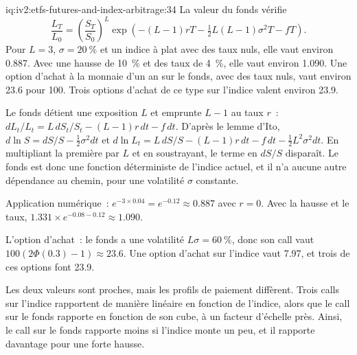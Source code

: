 \begin{solution}{iq:iv2:etfs-futures-and-index-arbitrage:34}
La valeur du fonds vérifie
\[
\frac{L_T}{L_0} = \left(\frac{S_T}{S_0}\right)^{\!L}\exp\left(-(L - 1)rT - \tfrac12L(L - 1)\sigma^2T - fT\right).
\]
Pour $L = 3$, $\sigma = 20~\%$ et un indice à plat avec des taux nuls, elle vaut environ 0.887. Avec une hausse de 10~\% et des taux de 4~\%, elle vaut environ 1.090. Une option d'achat à la monnaie d'un an sur le fonds, avec des taux nuls, vaut environ 23.6 pour 100. Trois options d'achat de ce type sur l'indice valent environ 23.9.

Le fonds détient une exposition $L$ et emprunte $L - 1$ au taux $r$~: $dL_t/L_t = L\,dS_t/S_t - (L - 1)r\,dt - f\,dt$. D'après le lemme d'Ito, $d\ln S = dS/S - \tfrac12\sigma^2dt$ et $d\ln L_t = L\,dS/S - (L - 1)r\,dt - f\,dt - \tfrac12L^2\sigma^2dt$. En multipliant la première par $L$ et en soustrayant, le terme en $dS/S$ disparaît. Le fonds est donc une fonction déterministe de l'indice actuel, et il n'a aucune autre dépendance au chemin, pour une volatilité $\sigma$ constante.

Application numérique~: $e^{-3 \times 0.04} = e^{-0.12} \approx 0.887$ avec $r = 0$. Avec la hausse et le taux, $1.331 \times e^{-0.08 - 0.12} \approx 1.090$.

L'option d'achat~: le fonds a une volatilité $L\sigma = 60~\%$, donc son call vaut $100(2\Phi(0.3) - 1) \approx 23.6$. Une option d'achat sur l'indice vaut 7.97, et trois de ces options font 23.9.

Les deux valeurs sont proches, mais les profils de paiement diffèrent. Trois calls sur l'indice rapportent de manière linéaire en fonction de l'indice, alors que le call sur le fonds rapporte en fonction de son cube, à un facteur d'échelle près. Ainsi, le call sur le fonds rapporte moins si l'indice monte un peu, et il rapporte davantage pour une forte hausse.

\end{solution}

